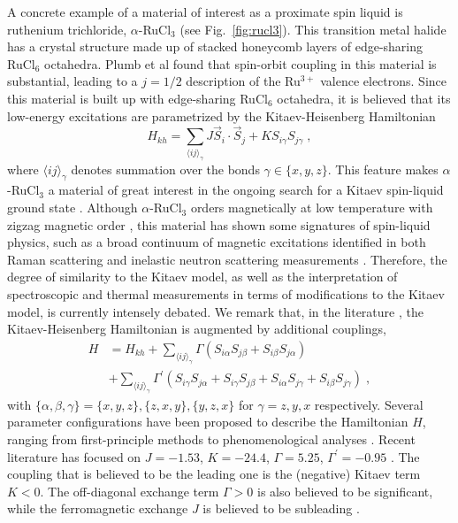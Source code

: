A concrete example of a material of interest as a proximate spin liquid \cite{chamorro2020chemistry} is ruthenium trichloride, $\alpha$-RuCl$_3$ (see Fig.~\ref{fig:rucl3}). This transition metal halide has a crystal structure made up of stacked honeycomb layers of edge-sharing RuCl$_6$ octahedra. Plumb et al \cite{plumb2014alpha} found that spin-orbit coupling in this material is substantial, leading to a $j=1/2$ description of the Ru$^{3+}$ valence electrons. 
Since this material is built up with edge-sharing RuCl$_6$ octahedra, it is believed \cite{kitaev2006anyons,jackeli2009mott} that its low-energy excitations are parametrized by the Kitaev-Heisenberg Hamiltonian
\begin{equation}
H_{kh} = \sum_{\langle ij \rangle_\gamma} J \vec S_i \cdot \vec S_j + K S_{i \gamma} S_{j \gamma} \;,
\end{equation}
where $\langle ij \rangle_\gamma$ denotes summation over the bonds $\gamma \in \{x,y,z\}$. This feature makes $\alpha$-RuCl$_3$ a material of great interest in the ongoing search for a Kitaev spin-liquid ground state \cite{koitzsch2016j,nasu2016fermionic,banerjee2016proximate}. Although $\alpha$-RuCl$_3$ orders magnetically at low temperature with zigzag magnetic order \cite{banerjee2016proximate,sears2015magnetic}, this material has shown some signatures of spin-liquid physics, such as a broad continuum of magnetic excitations identified in both Raman scattering \cite{sandilands2015scattering} and inelastic neutron scattering measurements \cite{banerjee2016proximate}.
Therefore, the degree of similarity to the Kitaev model, as well as the interpretation of spectroscopic and thermal measurements in terms of modifications to the Kitaev model, is currently intensely debated. We remark that, in the literature \cite{maksimov2020rethinking}, the Kitaev-Heisenberg Hamiltonian is augmented by additional couplings, 
\begin{equation}
\begin{split}
H &= H_{kh} + \sum_{\langle ij \rangle_\gamma} \Gamma ( S_{i\alpha} S_{j\beta} + S_{i\beta} S_{j\alpha} ) \\
&+ \sum_{\langle ij \rangle_\gamma} \Gamma^\prime ( S_{i\gamma} S_{j\alpha} + S_{i\gamma} S_{j\beta} + S_{i\alpha} S_{j\gamma} + S_{i\beta} S_{j\gamma} )  \;,
\end{split}
\end{equation}
with $\{\alpha,\beta,\gamma\} = \{x,y,z\} , \{z,x,y\}, \{y,z,x\}$ for $\gamma = z,y,x$ respectively. Several parameter configurations have been proposed to describe the Hamiltonian $H$, ranging from first-principle methods \cite{yadav2016kitaev,maksimov2020rethinking} to phenomenological analyses \cite{banerjee2016proximate,maksimov2020rethinking}. Recent literature has focused on $J = -1.53$, $K= -24.4$, $\Gamma = 5.25$, $\Gamma^\prime=-0.95$ \cite{tazhigulov2022simulating}. The coupling that is believed to be the leading one is the (negative) Kitaev term $K<0$. The off-diagonal exchange term $\Gamma>0$ is also believed to be significant, while the ferromagnetic exchange $J$ is believed to be subleading \cite{winter2017models}.
